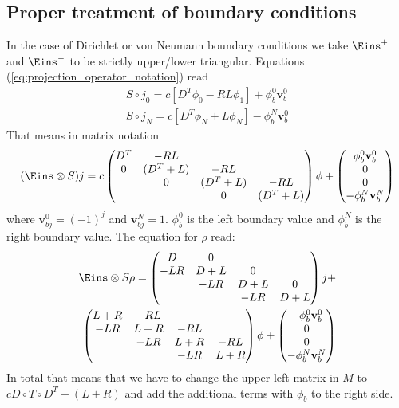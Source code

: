 \documentclass[a4paper,12pt]{scrartcl}
\renewcommand{\vec}[1]{{\mathbf{#1}}}
\begin{document}
\subsection{Proper treatment of boundary conditions}
In the case of Dirichlet or von Neumann boundary conditions we take $\Eins^+$ and
$\Eins^-$ to be strictly upper/lower triangular. Equations (\ref{eq:projection_operator_notation}) read
\begin{subequations}
    \begin{align}
        S\circ j_0 = c[ D^T\phi_0 - RL\phi_1] + \phi_b^0 \vec v_b^0 \\
        S\circ j_N = c[ D^T\phi_N + L\phi_N] - \phi_b^N \vec v_b^0 
    \end{align}
    \label{eq:dirichlet}
\end{subequations}
That means in matrix notation 
\begin{align}
    (\Eins\otimes S) j = c\begin{pmatrix}
        D^T & -RL & &  \\
          0 & (D^T + L) & -RL & \\
            &0& (D^T + L) & -RL \\
            & &0& (D^T + L)  
    \end{pmatrix}
    \phi + 
    \begin{pmatrix}
        \phi_b^0 \vec v_b^0 \\
        0\\
        0\\
        -\phi_b^N \vec v_b^N
    \end{pmatrix}
    \label{}
\end{align}
where $\vec v_{bj}^0 = (-1)^j$ and $\vec v_{bj}^N = 1$. $\phi_b^0$ is the 
left boundary value and $\phi_b^N$ is the right boundary value.
The equation for $\rho$ read:
\begin{align}
    \Eins\otimes S \rho = 
    \begin{pmatrix}
        D &0 & &\\
        -LR & D+L &0 & \\
            & -LR & D+L &0\\
            & & -LR & D+L
    \end{pmatrix}j+\nonumber \\
    \begin{pmatrix}
        L+R & -RL & &\\
        -LR & L+R & -RL&\\
            & -LR & L+R & -RL\\
            & & -LR & L+R
    \end{pmatrix}\phi +
    \begin{pmatrix}
        -\phi_b^0 \vec v_b^0 \\
        0\\
        0\\
        -\phi_b^N \vec v_b^N
    \end{pmatrix}
    \label{}
\end{align}
In total that means that we have to change the upper left 
matrix in $M$ to $cD\circ T \circ D^T + (L+R)$ and add the additional terms 
with $\phi_b$ to the right side. 
\end{document}
